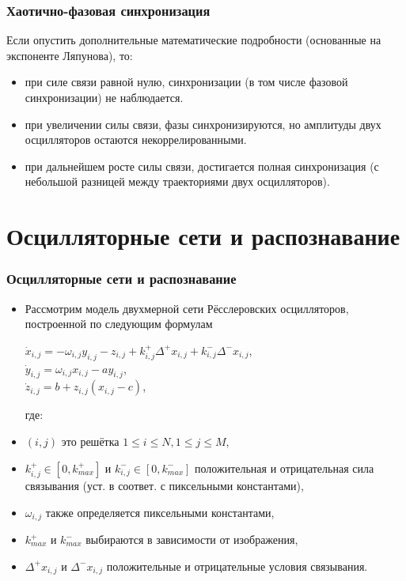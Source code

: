 \documentclass{beamer}
\begin{document}

\begin{frame}
\frametitle{Хаотично-фазовая синхронизация}

Если опустить дополнительные математические подробности (основанные на экспоненте Ляпунова), то:

\begin{itemize}
\item при силе связи равной нулю, синхронизации (в том числе фазовой синхронизации) не наблюдается.
\medskip
\item при увеличении силы связи, фазы синхронизируются, но амплитуды двух осцилляторов остаются некоррелированными.
\medskip
\item при дальнейшем росте силы связи, достигается полная синхронизация (с небольшой разницей между траекториями двух осцилляторов).
\end{itemize}

\end{frame}

\section{Осцилляторные сети и распознавание}

\begin{frame}
\frametitle{Осцилляторные сети и распознавание}

\begin{itemize}
\item[]Рассмотрим модель двухмерной сети Рёсслеровских осцилляторов, построенной по следующим формулам
\begin{center}
$\dot{x}_{i,j} = -\omega_{i,j}y_{i,j} - z_{i,j} + k^{+}_{i,j}\Delta^{+}x_{i,j} + k^{-}_{i,j}\Delta^{-}x_{i,j}$,\\
$\dot{y}_{i,j} = \omega_{i,j}x_{i,j} - ay_{i,j}$,\\
$\dot{z}_{i,j} = b + z_{i,j}(x_{i,j} - c)$,
\end{center}
где:
\item[] $(i, j)$ это решётка $1 \le i \le N, 1 \le j \le M$,
\item[] $k^{+}_{i,j} \in [0, k^{+}_{max}]$ и $k^{-}_{i,j} \in [0, k^{-}_{max}]$ положительная и отрицательная сила связывания (уст. в соответ. с пиксельными константами),
\item[] $\omega_{i,j}$ также определяется пиксельными константами,
\item[] $k^{+}_{max}$ и $k^{-}_{max}$ выбираются в зависимости от изображения,
\item[] $\Delta^{+}x_{i,j}$ и $\Delta^{-}x_{i,j}$ положительные и отрицательные условия связывания.
\end{itemize}

\end{frame}
\end{document}
